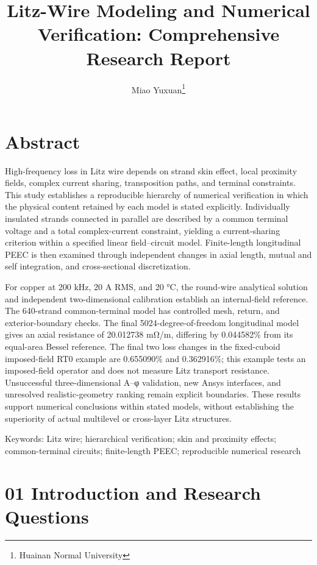 \documentclass[journal,10pt]{IEEEtran}
\begin{document}
\title{Litz-Wire Modeling and Numerical Verification: Comprehensive Research Report}
\author{Miao Yuxuan\thanks{Huainan Normal University}}

\maketitle
\FloatBarrier
\section*{Abstract}
\hypertarget{abstract}{}
High-frequency loss in Litz wire depends on strand skin effect, local proximity fields, complex current sharing, transposition paths, and terminal constraints. This study establishes a reproducible hierarchy of numerical verification in which the physical content retained by each model is stated explicitly. Individually insulated strands connected in parallel are described by a common terminal voltage and a total complex-current constraint, yielding a current-sharing criterion within a specified linear field–circuit model. Finite-length longitudinal PEEC is then examined through independent changes in axial length, mutual and self integration, and cross-sectional discretization.

For copper at 200 kHz, 20 A RMS, and 20 °C, the round-wire analytical solution and independent two-dimensional calibration establish an internal-field reference. The 640-strand common-terminal model has controlled mesh, return, and exterior-boundary checks. The final 5024-degree-of-freedom longitudinal model gives an axial resistance of 20.012738 mΩ/m, differing by 0.044582\% from its equal-area Bessel reference. The final two loss changes in the fixed-cuboid imposed-field RT0 example are 0.655090\% and 0.362916\%; this example tests an imposed-field operator and does not measure Litz transport resistance. Unsuccessful three-dimensional A–φ validation, new Ansys interfaces, and unresolved realistic-geometry ranking remain explicit boundaries. These results support numerical conclusions within stated models, without establishing the superiority of actual multilevel or cross-layer Litz structures.


Keywords: Litz wire; hierarchical verification; skin and proximity effects; common-terminal circuits; finite-length PEEC; reproducible numerical research


\FloatBarrier
\section*{01 Introduction and Research Questions}
\hypertarget{chapter-01}{}
\end{document}
